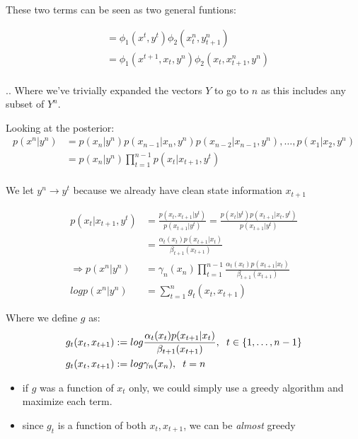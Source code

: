 \documentclass{article}
\begin{document}
These two terms can be seen as two general funtions:

\begin{align*}
&= \phi_1(x^t, y^t)\phi_2(x_{t}^{n}, y_{t+1}^{n})\\
&= \phi_1(x^{t+1}, x_t, y^n) \phi_2(x_t, x_{t+1}^{n}, y^n)\\
\end{align*}

.. Where we've trivially expanded the vectors $Y$ to go to $n$ as this includes any subset of $Y^n$.  

Looking at the posterior:
\begin{align*}
p(x^n | y^n) &= p(x_n | y^n) p(x_{n-1} | x_n, y^n)p(x_{n-2} | x_{n-1}, y^n),\dots, p(x_1 | x_2, y^n)\\
&= p(x_n | y^n) \prod_{t=1}^{n-1}p(x_t | x_{t+1}, y^t)\\
\end{align*}

We let $y^n \rightarrow y^t$ because we already have clean state information $x_{t+1}$

\begin{align*}
p(x_t | x_{t+1}, y^t) &= \frac{p(x_t , x_{t+1} | y^t)}{p(x_{t+1} | y^t)} = \frac{p(x_t | y^t) p(x_{t+1} | x_t , y^t)}{p(x_{t+1} | y^t)}\\
&= \frac{\alpha_t (x_t) p(x_{t+1} | x_t)}{\beta_{t+1}(x_{t+1})}\\
\Rightarrow p(x^n | y^n) &= \gamma_n (x_n) \prod_{t=1}^{n-1} \frac{\alpha_t (x_t) p(x_{t+1} | x_t)}{\beta_{t+1} (x_{t+1})}\\
log p(x^n | y^n) &= \sum_{t = 1}^{n} g_t (x_t, x_{t+1})
\end{align*}

Where  we define $g$ as:
\begin{align*}
g_t(x_t, x_{t+1}) &:= log \frac{\alpha_t (x_t) p(x_{t+1} | x_t)}{\beta_{t+1}(x_{t+1})}, \hspace{2 mm} t \in \{1, \dots , n-1\}\\
g_t(x_t, x_{t+1}) &:= log \gamma_n (x_n), \hspace{2 mm } t = n
\end{align*}	

\begin{itemize}
	\item  if $g$ was a function of $x_t$ only, we could simply use a greedy algorithm and maximize each term.
	\item since $g_t$ is a function of both $x_t, x_{t+1}$, we can be \textit{almost} greedy
\end{itemize}
\end{document}
